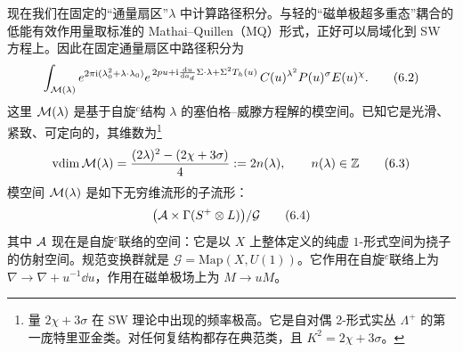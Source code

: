 现在我们在固定的“通量扇区”$\lambda$ 中计算路径积分。与轻的“磁单极超多重态”耦合的低能有效作用量取标准的 Mathai--Quillen（MQ）形式，正好可以局域化到 SW 方程上。因此在固定通量扇区中路径积分为
\begin{equation}
\int_{\mathcal{M}(\lambda)}
e^{2\pi\mathrm{i}(\lambda_0^2+\lambda\cdot\lambda_0)}
e^{\,2pu+\mathrm{i}\frac{\mathrm{d} u}{\mathrm{d} a_d}\Sigma\cdot\lambda+\Sigma^{2}T_h(u)}
\,C(u)^{\lambda^{2}}P(u)^{\sigma}E(u)^{\chi}.
\tag{6.2}
\end{equation}
这里 $\mathcal{M}(\lambda)$ 是基于自旋$^{c}$结构 $\lambda$ 的塞伯格--威滕方程解的模空间。已知它是光滑、紧致、可定向的，其维数为\footnote{量 $2\chi+3\sigma$ 在 SW 理论中出现的频率极高。它是自对偶 2-形式实丛 $\Lambda^{+}$ 的第一庞特里亚金类。对任何复结构都存在典范类，且 $K^{2}=2\chi+3\sigma$。}
\begin{equation}
\operatorname{vdim}\mathcal{M}(\lambda)=\frac{(2\lambda)^{2}-(2\chi+3\sigma)}{4}:=2n(\lambda),
\qquad n(\lambda)\in\mathbb{Z}
\tag{6.3}
\end{equation}
模空间 $\mathcal{M}(\lambda)$ 是如下无穷维流形的子流形：
\begin{equation}
\bigl(\mathcal{A}\times\Gamma(S^{+}\otimes L)\bigr)/\mathcal{G}
\tag{6.4}
\end{equation}
其中 $\mathcal{A}$ 现在是自旋$^{c}$联络的空间：它是以 $X$ 上整体定义的纯虚 $1$-形式空间为挠子的仿射空间。规范变换群就是 $\mathcal{G}=\mathrm{Map}(X,U(1))$。它作用在自旋$^{c}$联络上为 $\nabla\to\nabla+u^{-1}\dd u$，作用在磁单极场上为 $M\to uM$。
